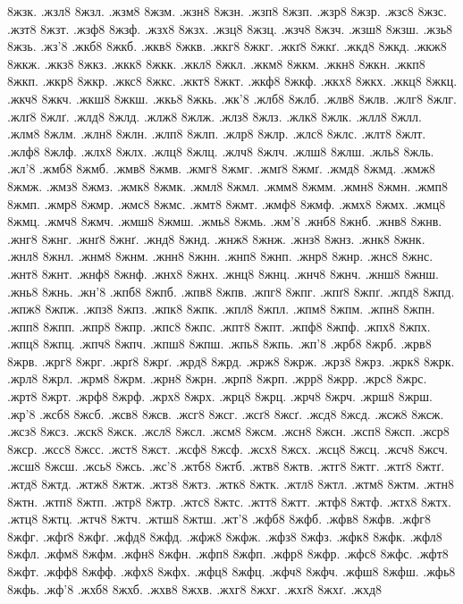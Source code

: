 {8жзк.
.жзл8
8жзл.
.жзм8
8жзм.
.жзн8
8жзн.
.жзп8
8жзп.
.жзр8
8жзр.
.жзс8
8жзс.
.жзт8
8жзт.
.жзф8
8жзф.
.жзх8
8жзх.
.жзц8
8жзц.
.жзч8
8жзч.
.жзш8
8жзш.
.жзь8
8жзь.
.жз'8
.жкб8
8жкб.
.жкв8
8жкв.
.жкг8
8жкг.
.жкґ8
8жкґ.
.жкд8
8жкд.
.жкж8
8жкж.
.жкз8
8жкз.
.жкк8
8жкк.
.жкл8
8жкл.
.жкм8
8жкм.
.жкн8
8жкн.
.жкп8
8жкп.
.жкр8
8жкр.
.жкс8
8жкс.
.жкт8
8жкт.
.жкф8
8жкф.
.жкх8
8жкх.
.жкц8
8жкц.
.жкч8
8жкч.
.жкш8
8жкш.
.жкь8
8жкь.
.жк'8
.жлб8
8жлб.
.жлв8
8жлв.
.жлг8
8жлг.
.жлґ8
8жлґ.
.жлд8
8жлд.
.жлж8
8жлж.
.жлз8
8жлз.
.жлк8
8жлк.
.жлл8
8жлл.
.жлм8
8жлм.
.жлн8
8жлн.
.жлп8
8жлп.
.жлр8
8жлр.
.жлс8
8жлс.
.жлт8
8жлт.
.жлф8
8жлф.
.жлх8
8жлх.
.жлц8
8жлц.
.жлч8
8жлч.
.жлш8
8жлш.
.жль8
8жль.
.жл'8
.жмб8
8жмб.
.жмв8
8жмв.
.жмг8
8жмг.
.жмґ8
8жмґ.
.жмд8
8жмд.
.жмж8
8жмж.
.жмз8
8жмз.
.жмк8
8жмк.
.жмл8
8жмл.
.жмм8
8жмм.
.жмн8
8жмн.
.жмп8
8жмп.
.жмр8
8жмр.
.жмс8
8жмс.
.жмт8
8жмт.
.жмф8
8жмф.
.жмх8
8жмх.
.жмц8
8жмц.
.жмч8
8жмч.
.жмш8
8жмш.
.жмь8
8жмь.
.жм'8
.жнб8
8жнб.
.жнв8
8жнв.
.жнг8
8жнг.
.жнґ8
8жнґ.
.жнд8
8жнд.
.жнж8
8жнж.
.жнз8
8жнз.
.жнк8
8жнк.
.жнл8
8жнл.
.жнм8
8жнм.
.жнн8
8жнн.
.жнп8
8жнп.
.жнр8
8жнр.
.жнс8
8жнс.
.жнт8
8жнт.
.жнф8
8жнф.
.жнх8
8жнх.
.жнц8
8жнц.
.жнч8
8жнч.
.жнш8
8жнш.
.жнь8
8жнь.
.жн'8
.жпб8
8жпб.
.жпв8
8жпв.
.жпг8
8жпг.
.жпґ8
8жпґ.
.жпд8
8жпд.
.жпж8
8жпж.
.жпз8
8жпз.
.жпк8
8жпк.
.жпл8
8жпл.
.жпм8
8жпм.
.жпн8
8жпн.
.жпп8
8жпп.
.жпр8
8жпр.
.жпс8
8жпс.
.жпт8
8жпт.
.жпф8
8жпф.
.жпх8
8жпх.
.жпц8
8жпц.
.жпч8
8жпч.
.жпш8
8жпш.
.жпь8
8жпь.
.жп'8
.жрб8
8жрб.
.жрв8
8жрв.
.жрг8
8жрг.
.жрґ8
8жрґ.
.жрд8
8жрд.
.жрж8
8жрж.
.жрз8
8жрз.
.жрк8
8жрк.
.жрл8
8жрл.
.жрм8
8жрм.
.жрн8
8жрн.
.жрп8
8жрп.
.жрр8
8жрр.
.жрс8
8жрс.
.жрт8
8жрт.
.жрф8
8жрф.
.жрх8
8жрх.
.жрц8
8жрц.
.жрч8
8жрч.
.жрш8
8жрш.
.жр'8
.жсб8
8жсб.
.жсв8
8жсв.
.жсг8
8жсг.
.жсґ8
8жсґ.
.жсд8
8жсд.
.жсж8
8жсж.
.жсз8
8жсз.
.жск8
8жск.
.жсл8
8жсл.
.жсм8
8жсм.
.жсн8
8жсн.
.жсп8
8жсп.
.жср8
8жср.
.жсс8
8жсс.
.жст8
8жст.
.жсф8
8жсф.
.жсх8
8жсх.
.жсц8
8жсц.
.жсч8
8жсч.
.жсш8
8жсш.
.жсь8
8жсь.
.жс'8
.жтб8
8жтб.
.жтв8
8жтв.
.жтг8
8жтг.
.жтґ8
8жтґ.
.жтд8
8жтд.
.жтж8
8жтж.
.жтз8
8жтз.
.жтк8
8жтк.
.жтл8
8жтл.
.жтм8
8жтм.
.жтн8
8жтн.
.жтп8
8жтп.
.жтр8
8жтр.
.жтс8
8жтс.
.жтт8
8жтт.
.жтф8
8жтф.
.жтх8
8жтх.
.жтц8
8жтц.
.жтч8
8жтч.
.жтш8
8жтш.
.жт'8
.жфб8
8жфб.
.жфв8
8жфв.
.жфг8
8жфг.
.жфґ8
8жфґ.
.жфд8
8жфд.
.жфж8
8жфж.
.жфз8
8жфз.
.жфк8
8жфк.
.жфл8
8жфл.
.жфм8
8жфм.
.жфн8
8жфн.
.жфп8
8жфп.
.жфр8
8жфр.
.жфс8
8жфс.
.жфт8
8жфт.
.жфф8
8жфф.
.жфх8
8жфх.
.жфц8
8жфц.
.жфч8
8жфч.
.жфш8
8жфш.
.жфь8
8жфь.
.жф'8
.жхб8
8жхб.
.жхв8
8жхв.
.жхг8
8жхг.
.жхґ8
8жхґ.
.жхд8
}
